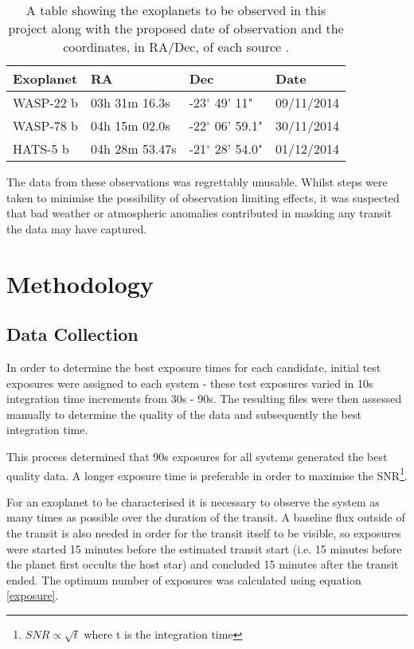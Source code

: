 \documentclass{report}
\begin{document}
\begin{table}[H]
    \centering
    \begin{tabular}{ | l | l | l | l | }
    \hline \hline
    Exoplanet & RA & Dec & Date       \\ \hline \hline
    WASP-22 b    & 03h 31m 16.3s & -23$^\circ$ 49' 11" & 09/11/2014 \\
    WASP-78 b   & 04h 15m 02.0s & -22$^\circ$ 06' 59.1" & 30/11/2014 \\
    HATS-5 b  & 04h 28m 53.47s & -21$^\circ$ 28' 54.0" & 01/12/2014 \\
    \hline
    \end{tabular}
    \caption{A table showing the exoplanets to be observed in this project along with the proposed date of observation and the coordinates, in RA/Dec, of each source \parencite{etd}.}
    \label{planets}
\end{table}

The data from these observations was regrettably unusable. Whilst steps were taken to minimise the possibility of observation limiting effects, it was suspected that bad weather or atmospheric anomalies contributed in masking any transit the data may have captured. 
 

\section{Methodology}
\subsection{Data Collection}
In order to determine the best exposure times for each candidate, initial test exposures
were assigned to each system - these test exposures varied in 10s integration time
increments from 30s - 90s. The resulting files were then assessed manually to determine
the quality of the data and subsequently the best integration time.

This process determined that 90s exposures for all systems generated the best quality
data. A longer exposure time is preferable in order to maximise the SNR\footnote{$SNR 
\propto \sqrt{t}$ where t is the integration time}. 

For an exoplanet to be characterised it is necessary to observe the system as many times as possible over the duration of the transit. A baseline flux outside of the transit is also needed in order for the transit itself to be visible, so exposures were started 15 minutes before the estimated transit start (i.e. 15 minutes before the planet first occults the host star) and concluded 15 minutes after the transit ended. The optimum number of exposures was calculated using equation \ref{exposure}. 
\end{document}
